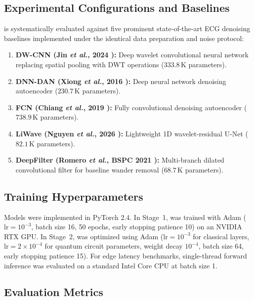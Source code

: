 \subsection{Experimental Configurations and Baselines}
\HSL{} is systematically evaluated against five prominent state-of-the-art ECG denoising baselines implemented under the identical data preparation and noise protocol:
\begin{enumerate}
    \item \textbf{DW-CNN (Jin \emph{et al.}, 2024 \cite{jin2024}):} Deep wavelet convolutional neural network replacing spatial pooling with DWT operations ($333.8$\,K parameters).
    \item \textbf{DNN-DAN (Xiong \emph{et al.}, 2016 \cite{xiong2016}):} Deep neural network denoising autoencoder ($230.7$\,K parameters).
    \item \textbf{FCN (Chiang \emph{et al.}, 2019 \cite{chiang2019}):} Fully convolutional denoising autoencoder ($738.9$\,K parameters).
    \item \textbf{LiWave (Nguyen \emph{et al.}, 2026 \cite{nguyen2026liwave}):} Lightweight 1D wavelet-residual U-Net ($82.1$\,K parameters).
    \item \textbf{DeepFilter (Romero \emph{et al.}, BSPC 2021 \cite{romero2021}):} Multi-branch dilated convolutional filter for baseline wander removal ($68.7$\,K parameters).
\end{enumerate}

\subsection{Training Hyperparameters}
Models were implemented in PyTorch 2.4. In Stage~1, \HSL{} was trained with Adam ($\text{lr} = 10^{-3}$, batch size 16, 50 epochs, early stopping patience 10) on an NVIDIA RTX GPU. In Stage~2, \RRN{} was optimized using Adam ($\text{lr} = 10^{-3}$ for classical layers, $\text{lr} = 2 \times 10^{-4}$ for quantum circuit parameters, weight decay $10^{-4}$, batch size 64, early stopping patience 15). For edge latency benchmarks, single-thread forward inference was evaluated on a standard Intel Core CPU at batch size 1.

\subsection{Evaluation Metrics}
